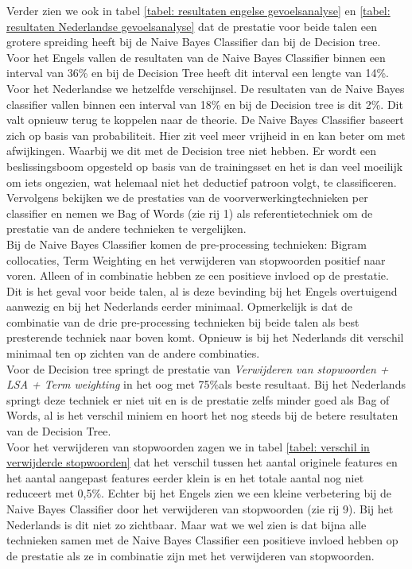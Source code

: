 Verder zien we ook in tabel \ref{tabel: resultaten engelse gevoelsanalyse} en \ref{tabel: resultaten Nederlandse gevoelsanalyse} dat de prestatie voor beide talen een grotere spreiding heeft bij de Naive Bayes Classifier dan bij de Decision tree. Voor het Engels vallen de resultaten van de Naive Bayes Classifier binnen een interval van 36\% en bij de Decision Tree heeft dit interval een lengte van 14\%. Voor het Nederlandse we hetzelfde verschijnsel. De resultaten van de Naive Bayes classifier vallen binnen een interval van 18\% en bij de Decision tree is dit 2\%. Dit valt opnieuw terug te koppelen naar de theorie. De Naive Bayes Classifier baseert zich op basis van probabiliteit. Hier zit veel meer vrijheid in en kan beter om met afwijkingen. Waarbij we dit met de Decision tree niet hebben. Er wordt een beslissingsboom opgesteld op basis van de trainingsset en het is dan veel moeilijk om iets ongezien, wat helemaal niet het deductief patroon volgt, te classificeren.\\

Vervolgens bekijken we de prestaties van de voorverwerkingtechnieken per classifier en nemen we Bag of Words (zie rij 1) als referentietechniek om de prestatie van de andere technieken te vergelijken.\\
Bij de Naive Bayes Classifier komen de pre-processing technieken: Bigram collocaties, Term Weighting en het verwijderen van stopwoorden positief naar voren. Alleen of in combinatie hebben ze een positieve invloed op de prestatie. Dit is het geval voor beide talen, al is deze bevinding bij het Engels overtuigend aanwezig en bij het Nederlands eerder minimaal. Opmerkelijk is dat de combinatie van de drie pre-processing technieken bij beide talen als best presterende techniek naar boven komt. Opnieuw is bij het Nederlands dit verschil minimaal ten op zichten van de andere combinaties.\\
Voor de Decision tree springt de prestatie van \textit{Verwijderen van stopwoorden + LSA + Term weighting} in het oog met 75\%als beste resultaat. Bij het Nederlands springt deze techniek er niet uit en is de prestatie zelfs minder goed als Bag of Words, al is het verschil miniem en hoort het nog steeds bij de betere resultaten van de Decision Tree.\\

Voor het verwijderen van stopwoorden zagen we in tabel \ref{tabel: verschil in verwijderde stopwoorden} dat het verschil tussen het aantal originele features en het aantal aangepast features eerder klein is en het totale aantal nog niet reduceert met 0,5\%. Echter bij het Engels zien we een kleine verbetering bij de Naive Bayes Classifier door het verwijderen van stopwoorden (zie rij 9). Bij het Nederlands is dit niet zo zichtbaar. Maar wat we wel zien is dat bijna alle technieken samen met de Naive Bayes Classifier een positieve invloed hebben op de prestatie als ze in combinatie zijn met het verwijderen van stopwoorden.\\

